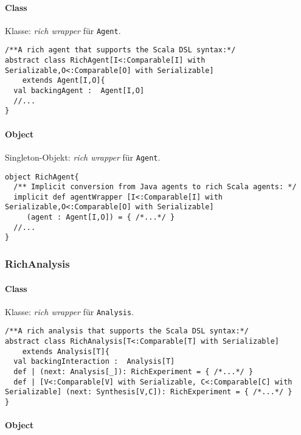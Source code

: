 \documentclass[abstracton, 12pt]{scrartcl}
\begin{document}
\paragraph{Class}

Klasse: \emph{rich wrapper} für \lstinline!Agent!.


\begin{lstlisting}
/**A rich agent that supports the Scala DSL syntax:*/
abstract class RichAgent[I<:Comparable[I] with Serializable,O<:Comparable[O] with Serializable] 
    extends Agent[I,O]{
  val backingAgent :  Agent[I,O]
  //...
}
\end{lstlisting}

\paragraph{Object}
\enlargethispage{0.5cm}
Singleton-Objekt: \emph{rich wrapper} für \lstinline!Agent!.

\begin{lstlisting}
object RichAgent{
  /** Implicit conversion from Java agents to rich Scala agents: */
  implicit def agentWrapper [I<:Comparable[I] with Serializable,O<:Comparable[O] with Serializable]
     (agent : Agent[I,O]) = { /*...*/ }
  //...
}    
\end{lstlisting}

\subsubsection{RichAnalysis}

\paragraph{Class}

Klasse: \emph{rich wrapper} für \lstinline!Analysis!.

\begin{lstlisting}
/**A rich analysis that supports the Scala DSL syntax:*/
abstract class RichAnalysis[T<:Comparable[T] with Serializable] 
    extends Analysis[T]{
  val backingInteraction :  Analysis[T]
  def | (next: Analysis[_]): RichExperiment = { /*...*/ }
  def | [V<:Comparable[V] with Serializable, C<:Comparable[C] with Serializable] (next: Synthesis[V,C]): RichExperiment = { /*...*/ }
}
\end{lstlisting}

\paragraph{Object}
\end{document}
